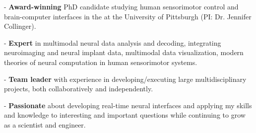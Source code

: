 \vspace*{-0.5cm}

\begin{cvparagraph}
- \textbf{Award-winning} PhD candidate studying human sensorimotor control and brain-computer interfaces in the  at the University of Pittsburgh (PI: Dr. Jennifer Collinger). 

- \textbf{Expert} in multimodal neural data analysis and decoding, integrating neuroimaging and neural implant data, multimodal data visualization, modern theories of neural computation in human sensorimotor systems.

- \textbf{Team leader} with experience in developing/executing large multidisciplinary projects, both collaboratively and independently.

- \textbf{Passionate} about developing real-time neural interfaces and applying my skills and knowledge to interesting and important questions while continuing to grow as a scientist and engineer.
\vspace*{-0.6cm}
\end{cvparagraph}
